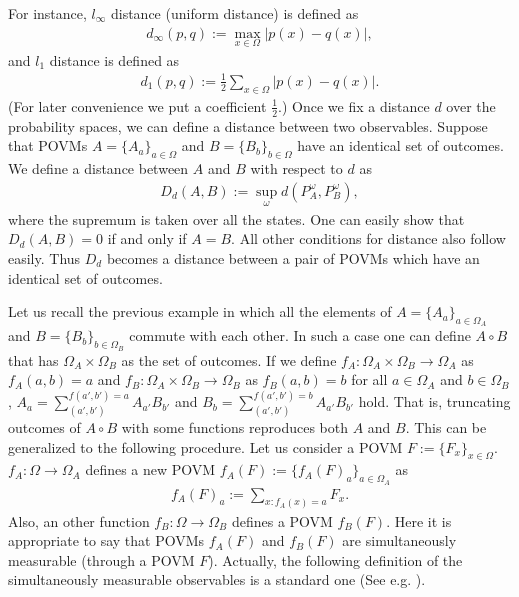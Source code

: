 \documentclass[12pt,showpacs,preprintnumbers,amsmath,amssymb]{revtex4-2}
\begin{document}
For instance, 
$l_{\infty}$ distance (uniform distance) is defined as
\begin{eqnarray*}
d_{\infty}(p,q):=\max_{x\in \Omega} |p(x)-q(x)|,
\end{eqnarray*}
and $l_{1}$ distance is defined as 
\begin{eqnarray*}
d_1(p,q):=\frac{1}{2}
\sum_{x \in \Omega} |p(x)-q(x)|.
\end{eqnarray*}
 (For later convenience 
we put a coefficient $\frac{1}{2}$.)
Once we fix a distance $d$ over the probability spaces, 
we can define a distance between two observables. 
Suppose that POVMs $A=\{A_a\}_{a \in \Omega}$ and $B=\{B_b\}_{b \in \Omega}$ 
have an identical set of outcomes. We define a distance between 
$A$ and $B$ with respect to $d$ as
\begin{eqnarray*}
D_d(A,B):=\sup_{\omega} d(P^{\omega}_A,P^{\omega}_B),
\end{eqnarray*}
where the supremum is taken over all the states.
One can easily show that $D_d(A,B)=0$ if and only if $A=B$. 
All other conditions for distance also follow easily.
Thus $D_d$ becomes a distance between a pair of POVMs 
which have an identical set of outcomes. 
\par
Let us recall the previous example in which 
all the elements of $A=\{A_a\}_{a \in \Omega_A}$ 
and $B=\{B_b\}_{b \in \Omega_B}$ commute with each other. 
In such a case one can define $A\circ B$ 
that has $\Omega_A \times \Omega_B$ as the set of 
outcomes.  
If we define $f_A: \Omega_A \times \Omega_B \to \Omega_A$ as 
$f_A(a,b)=a$ and $f_B: \Omega_A \times \Omega_B \to \Omega_B$ as 
$f_B(a,b)=b$ for all $a\in \Omega_A$ and 
$b \in \Omega_B$, $A_a =\sum_{(a',b')}^{f(a',b')=a}A_{a'} B_{b'}$ 
and $B_b =\sum_{(a',b')}^{f(a',b')=b}A_{a'} B_{b'}$ hold. 
That is, truncating outcomes of $A\circ B$ with some functions 
reproduces both $A$ and $B$.  
This can be generalized to the following procedure.
Let us consider a POVM $F:=\{F_x\}_{x \in \Omega}$. 
$f_A: \Omega \to \Omega_A$ defines a new POVM 
$f_A(F):=\{f_A(F)_a\}_{a \in \Omega_A}$ as 
\begin{eqnarray*}
f_A(F)_a :=\sum_{x: f_A(x)=a} F_x.
\end{eqnarray*}
Also, an other function $f_B: \Omega
\to \Omega_B$ defines a POVM $f_B(F)$. 
Here it is appropriate to say that 
POVMs $f_A(F)$ and $f_B(F)$ are simultaneously 
measurable (through a POVM $F$). 
Actually, the following definition of the simultaneously 
measurable observables is a standard one (See e.g. \cite{BHL,Araki}).
\end{document}
